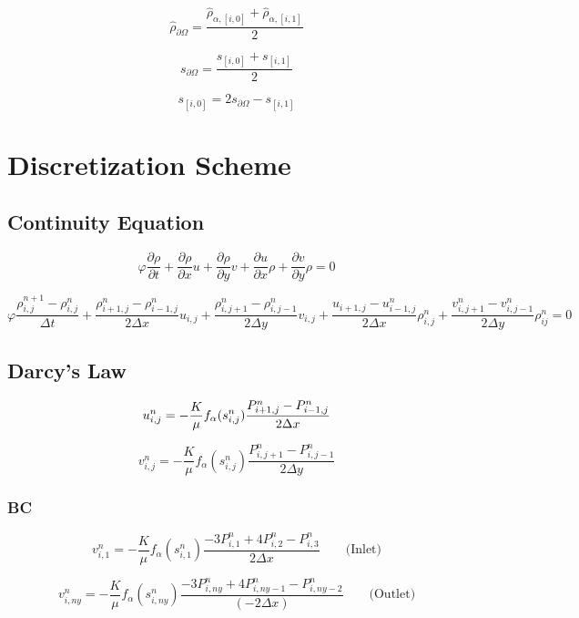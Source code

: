\documentclass[a4paper,12pt]{article}
\begin{document}
    \[
        \hat{\rho}_{\partial \Omega} = \frac{
          \hat{\rho}_{\alpha, [i, 0]}
      + \hat{\rho}_{\alpha, [i, 1]}}{2}
    \] 

    \[
        s_{\partial \Omega} = \frac{s_{[i, 0]} + s_{[i, 1]}}{2}
    \] 

    \[
        s_{[i, 0]} = 2 s_{\partial \Omega} - s_{[i, 1]}
    \] 

% 
% 
% 

\section{Discretization Scheme}

\subsection{Continuity Equation}

\[
\varphi \frac{\partial \rho}{\partial t}
+ \frac{\partial \rho}{\partial x} u
+ \frac{\partial \rho}{\partial y} v
+ \frac{\partial u}{\partial x} \rho
+ \frac{\partial v}{\partial y} \rho = 0
\] 

\[
\varphi \frac{\rho^{n + 1}_{i, j} - \rho^n_{i, j}}{\Delta t}
+ \frac{\rho_{i+1, j}^n - \rho_{i-1,j}^n}{2\Delta x} u_{i,j}
+ \frac{\rho_{i, j+1}^n - \rho_{i,j-1}^n}{2\Delta y} v_{i,j}
+ \frac{u_{i+1, j} - u_{i-1,j}^n}{2\Delta x} \rho_{i,j}^n
+ \frac{v_{i, j+1}^n - v_{i,j-1}^n}{2\Delta y} \rho_{ij}^n = 0
\] 
\subsection{Darcy's Law}

\[
    u_{i,j}^n = -\frac{K}{\mu} f_\alpha (s_{i, j}^n)
    \frac{P_{i + 1, j}^n - P_{i - 1, j}^n}{2\Delta x} \\
\] 

\[
    v_{i,j}^n = -\frac{K}{\mu} f_\alpha(s_{i, j}^n)
    \frac{P_{i, j + 1}^n - P_{i, j - 1}^n}{2\Delta y}
\] 

\subsubsection{BC}

\[
    v_{i, 1}^n = -\frac{K}{\mu} f_\alpha(s_{i, 1}^n)
    \frac{-3 P_{i, 1}^n + 4 P_{i, 2}^n - P_{i, 3}^n }
    {2 \Delta x} \qquad \text{(Inlet)}
\] 

\[
    v_{i, ny}^n = -\frac{K}{\mu} f_\alpha(s_{i, ny}^n)
    \frac{-3 P_{i, ny}^n + 4 P_{i, ny - 1}^n
    - P_{i, ny - 2}^n }{(-2 \Delta x)}
    \qquad \text{(Outlet)}
\] 
\end{document}
